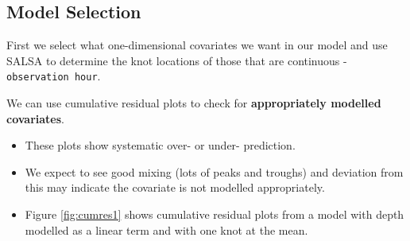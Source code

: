 \documentclass[11pt, a4paper]{article}
\begin{document}
\clearpage

\subsection{Model Selection}
\begin{frame}[fragile]
First we select what one-dimensional covariates we want in our model and use SALSA to determine the knot locations of those that are continuous - {\tt observation hour}.

\noindent We can use cumulative residual plots to check for \textbf{appropriately modelled covariates}.  
\begin{itemize}
\item These plots show systematic over- or under- prediction.  
\item We expect to see good mixing (lots of peaks and troughs) and deviation from this may indicate the covariate is not modelled appropriately.
\item Figure \ref{fig:cumres1} shows cumulative residual plots from a model with depth modelled as a linear term and with one knot at the mean.
\end{itemize} 
\end{frame}
\end{document}

